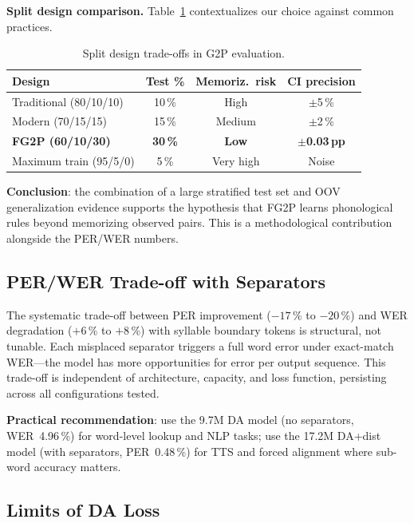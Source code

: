 \documentclass[conference]{IEEEtran}
\begin{document}
\textbf{Split design comparison.}
Table~\ref{tab:splits} contextualizes our choice against common
practices.

\begin{table}[t]
  \caption{Split design trade-offs in G2P evaluation.}
  \label{tab:splits}
  \centering\small
  \begin{tabular}{lccc}
    \toprule
    Design & Test \% & Memoriz.\ risk & CI precision \\
    \midrule
    Traditional (80/10/10) & 10\,\% & High & $\pm$5\,\% \\
    Modern (70/15/15)      & 15\,\% & Medium & $\pm$2\,\% \\
    \textbf{FG2P (60/10/30)} & \textbf{30\,\%} & \textbf{Low} & $\boldsymbol{\pm}$\textbf{0.03\,pp} \\
    Maximum train (95/5/0) & 5\,\% & Very high & Noise \\
    \bottomrule
  \end{tabular}
\end{table}

\textbf{Conclusion}: the combination of a large stratified test set
and OOV generalization evidence supports the hypothesis that FG2P
learns phonological rules beyond memorizing observed pairs.
This is a methodological contribution alongside the PER/WER numbers.

\subsection{PER/WER Trade-off with Separators}

The systematic trade-off between PER improvement ($-17$\,\% to
$-20$\,\%) and WER degradation ($+6$\,\% to $+8$\,\%) with
syllable boundary tokens is structural, not tunable.
Each misplaced separator triggers a full word error under
exact-match WER---the model has more opportunities for error per
output sequence.
This trade-off is independent of architecture, capacity, and loss
function, persisting across all configurations tested.

\textbf{Practical recommendation}: use the 9.7M DA model (no
separators, WER~4.96\,\%) for word-level lookup and NLP tasks;
use the 17.2M DA+dist model (with separators, PER~0.48\,\%) for
TTS and forced alignment where sub-word accuracy matters.

\subsection{Limits of DA Loss}
\end{document}
